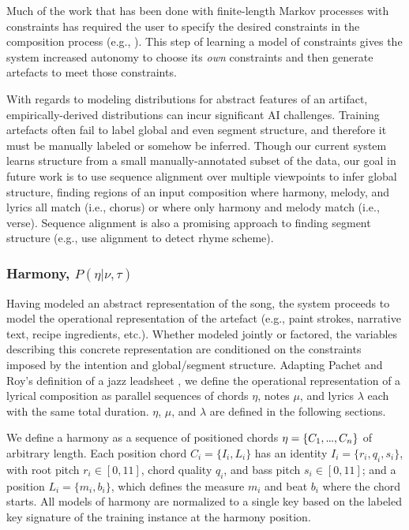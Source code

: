 \documentclass[letterpaper]{article}
\newcommand\mydots{\hbox to .75em{.\hss.\hss.}}
\begin{document}
Much of the work that has been done with finite-length Markov processes with constraints has required the user to specify the desired constraints in the composition process (e.g., \cite{pachet2014imitative,barbieri2012markov}). This step of learning a model of constraints gives the system increased autonomy to choose its \emph{own} constraints and then generate artefacts to meet those constraints.

With regards to modeling distributions for abstract features of an artifact, empirically-derived distributions can incur significant AI challenges. Training artefacts often fail to label global and even segment structure, and therefore it must be manually labeled or somehow be inferred. Though our current system learns structure from a small manually-annotated subset of the data, our goal in future work is to use sequence alignment over multiple viewpoints to infer global structure, finding regions of an input composition where harmony, melody, and lyrics all match (i.e., chorus) or where only harmony and melody match (i.e., verse). Sequence alignment is also a promising approach to finding segment structure (e.g., \cite{hirjee2010using} use alignment to detect rhyme scheme).

\subsubsection{Harmony, $P(\eta|\nu,\tau)$}

Having modeled an abstract representation of the song, the system proceeds to model the operational representation of the artefact (e.g., paint strokes, narrative text, recipe ingredients, etc.). Whether modeled jointly or factored, the variables describing this concrete representation are conditioned on the constraints imposed by the intention and global/segment structure. Adapting Pachet and Roy's definition of a jazz leadsheet \citeyear{pachet2014imitative}, we define the operational representation of a lyrical composition as parallel sequences of chords $\eta$, notes $\mu$, and lyrics $\lambda$ each with the same total duration. $\eta$, $\mu$, and $\lambda$ are defined in the following sections.

We define a harmony as a sequence of positioned chords $\eta = \{C_1,\mydots,C_n\}$ of arbitrary length. Each position chord $C_i = \{I_i,L_i\}$ has an identity $I_i = \{r_i,q_i,s_i\}$, with root pitch $r_i\in[0,11]$, chord quality $q_i$, and bass pitch $s_i\in[0,11]$; and a position $L_i = \{m_i,b_i\}$, which defines the measure $m_i$ and beat $b_i$ where the chord starts. All models of harmony are normalized to a single key based on the labeled key signature of the training instance at the harmony position.
\end{document}
